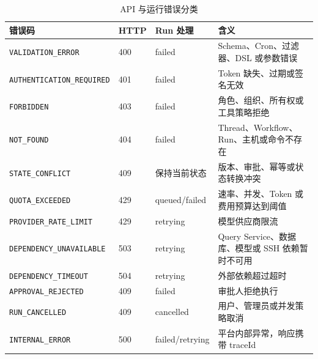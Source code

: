 \documentclass[conference,10pt]{IEEEtran}
\newcommand{\code}[1]{\texttt{#1}}
\begin{document}
\begin{table}[htbp]
\caption{API 与运行错误分类}
\label{tab:appendix-errors}
\centering
\small
\begin{tabularx}{\textwidth}{p{3.8cm}p{2.1cm}p{2.1cm}Y}
\toprule
\textbf{错误码} & \textbf{HTTP} & \textbf{Run 处理} & \textbf{含义} \\
\midrule
\code{VALIDATION\_ERROR} & 400 & failed & Schema、Cron、过滤器、DSL 或参数错误 \\
\code{AUTHENTICATION\_REQUIRED} & 401 & failed & Token 缺失、过期或签名无效 \\
\code{FORBIDDEN} & 403 & failed & 角色、组织、所有权或工具策略拒绝 \\
\code{NOT\_FOUND} & 404 & failed & Thread、Workflow、Run、主机或命令不存在 \\
\code{STATE\_CONFLICT} & 409 & 保持当前状态 & 版本、审批、幂等或状态转换冲突 \\
\code{QUOTA\_EXCEEDED} & 429 & queued/failed & 速率、并发、Token 或费用预算达到阈值 \\
\code{PROVIDER\_RATE\_LIMIT} & 429 & retrying & 模型供应商限流 \\
\code{DEPENDENCY\_UNAVAILABLE} & 503 & retrying & Query Service、数据库、模型或 SSH 依赖暂时不可用 \\
\code{DEPENDENCY\_TIMEOUT} & 504 & retrying & 外部依赖超过超时 \\
\code{APPROVAL\_REJECTED} & 409 & failed & 审批人拒绝执行 \\
\code{RUN\_CANCELLED} & 409 & cancelled & 用户、管理员或并发策略取消 \\
\code{INTERNAL\_ERROR} & 500 & failed/retrying & 平台内部异常，响应携带 traceId \\
\bottomrule
\end{tabularx}
\end{table}

\clearpage
\twocolumn


\end{document}
